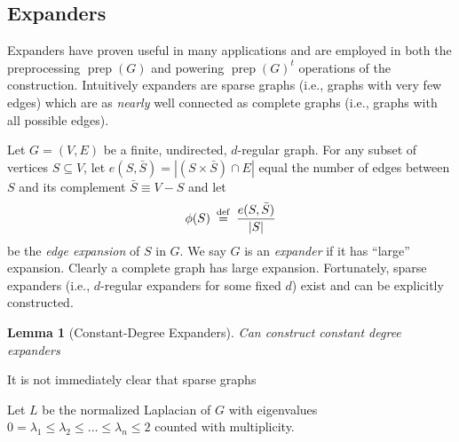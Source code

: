 \documentclass{article}
\newtheorem{lemma}[theorem]{Lemma}
\newcommand{\prep}{{\operatorname{prep}}}
\newcommand{\eqdef}{\mathbin{\stackrel{\rm def}{=}}}
\begin{document}
\subsection{Expanders}

Expanders have proven useful in many applications
and are employed in both the preprocessing $\prep(G)$ and powering $\prep(G)^t$ operations
of the construction.
Intuitively expanders are sparse graphs (i.e., graphs with very few edges)
which are as \emph{nearly} well connected as complete graphs (i.e., graphs with all possible edges).

Let $G = (V, E)$ be a finite, undirected, $d$-regular graph.
For any subset of vertices $S \subseteq V$,
let $e(S, \bar{S}) = |(S\times \bar{S})\cap E|$ equal the number of edges
between $S$ and its complement $\bar{S} \equiv V - S$ and
let
\begin{align*}
\phi(S) \;\eqdef\; \frac{e(S, \bar{S})}{|S|} %
\end{align*}
be the \emph{edge expansion} of $S$ in $G$.
We say $G$ is an \emph{expander} if it has ``large'' expansion.
Clearly a complete graph has large expansion.
Fortunately, sparse expanders (i.e., $d$-regular expanders
for some fixed $d$) exist and can be explicitly constructed.

\begin{lemma}[Constant-Degree Expanders]
Can construct constant degree expanders\citep*{reingold2002entropy}
\end{lemma}


It is not immediately clear that sparse graphs


Let $L$ be the normalized Laplacian of $G$ with eigenvalues
$0 = \lambda_1 \le \lambda_2 \le \dots \le \lambda_n \le 2$
counted with multiplicity.
\end{document}
